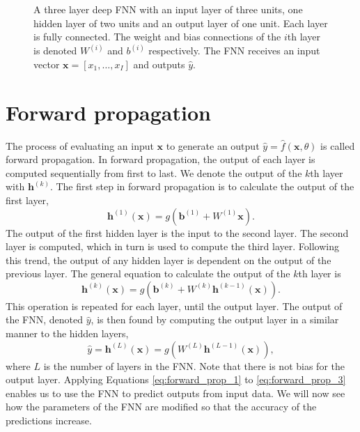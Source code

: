 \begin{figure}[htb!]
    \centering
    
    \caption[A feed forward neural network]{A three layer deep FNN with an input layer of three units, one hidden layer of two units and an output layer of one unit. Each layer is fully connected. The weight and bias connections of the $i$th layer is denoted $W^{(i)}$ and $b^{(i)}$ respectively.
    The FNN receives an input vector $\bm{x}=[x_1, \ldots ,x_I]$ and outputs $\hat{y}$.}
    \label{fig:neural_network}
\end{figure}


\section{Forward propagation}
The process of evaluating an input $\bm{x}$ to generate an output $\hat{y} = \hat{f}(\bm{x},\theta)$ is called forward propagation.
In forward propagation, the output of each layer is computed sequentially from first to last.
We denote the output of the $k$th layer with $\mathbf{h}^{(k)}$.
The first step in forward propagation is to calculate the output of the first layer,
\begin{equation}\label{eq:forward_prop_1}
    \mathbf{h}^{(1)}(\bm{x}) = g(\mathbf{b}^{(1)} + W^{(1)} \bm{x} ). 
\end{equation}
The output of the first hidden layer is the input to the second layer.
The second layer is computed, which in turn is used to compute the third layer.
Following this trend, the output of any hidden layer is dependent on the output of the previous layer.
The general equation to calculate the output of the $k$th layer is
\begin{equation}\label{eq:forward_prop_2}
    \mathbf{h}^{(k)}(\bm{x}) = g(\mathbf{b}^{(k)} + W^{(k)} \mathbf{h}^{(k-1)}(\bm{x}) ).
\end{equation}
This operation is repeated for each layer, until the output layer.
The output of the FNN, denoted $\hat{y}$, is then found by computing the output layer in a similar manner to the hidden layers,
\begin{equation}\label{eq:forward_prop_3}
    \hat{y} = \mathbf{h}^{(L)}(\bm{x}) = g(W^{(L)} \mathbf{h}^{(L-1)}(\bm{x}) ),
\end{equation}
where $L$ is the number of layers in the FNN. Note that there is not bias for the output layer.
Applying Equations \ref{eq:forward_prop_1} to \ref{eq:forward_prop_3} enables us to use the FNN to predict outputs from input data.
We will now see how the parameters of the FNN are modified so that the accuracy of the predictions increase.

